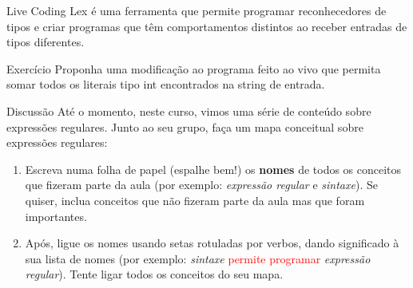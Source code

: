 \documentclass{beamer}
\begin{document}
\begin{frame}{Live Coding}
  \centering
  \Large
  Lex é uma ferramenta que permite programar reconhecedores de tipos e criar
  programas que têm comportamentos distintos ao receber entradas de tipos
  diferentes.
\end{frame}

\begin{frame}{Exercício}
  \centering
  \large
  Proponha uma modificação ao programa feito ao vivo que permita somar todos os
  literais tipo int encontrados na string de entrada.
\end{frame}

\begin{frame}{Discussão}
\large
  Até o momento, neste curso, vimos uma série de conteúdo sobre expressões
  regulares. Junto ao seu grupo, faça um mapa conceitual sobre expressões
  regulares:
  \begin{enumerate}
    \item Escreva numa folha de papel (espalhe bem!) os \textbf{nomes} de todos
      os conceitos que fizeram parte da aula (por exemplo: \textit{expressão
      regular} e \textit{sintaxe}). Se quiser, inclua conceitos que não fizeram
      parte da aula mas que foram importantes.
    \item Após, ligue os nomes usando setas rotuladas por verbos, dando
      significado à sua lista de nomes (por exemplo: \textit{sintaxe}
      \textcolor{red}{permite programar} \textit{expressão regular}). Tente
      ligar todos os conceitos do seu mapa.
  \end{enumerate}

\end{frame}
\end{document}
